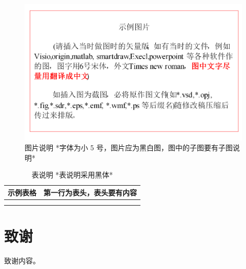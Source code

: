 \documentclass{cjc}
\begin{document}
\begin{figure}[htb]
  \centering
  \includegraphics[width=\linewidth]{example-fig.pdf}
  \caption{图片说明 *字体为小 5 号，图片应为黑白图，图中的子图要有子图说明*}
\end{figure}

\begin{table}[htb]
  \centering
  \caption{表说明 *表说明采用黑体*}
  \small
  \begin{tabular}{cc}
    \toprule
    示例表格 & 第一行为表头，表头要有内容 \\
    \midrule
             &                            \\
    \midrule
             &                            \\
    \bottomrule
  \end{tabular}
\end{table}





\section*{致谢}

致谢内容。


\nocite{*}
\end{document}
